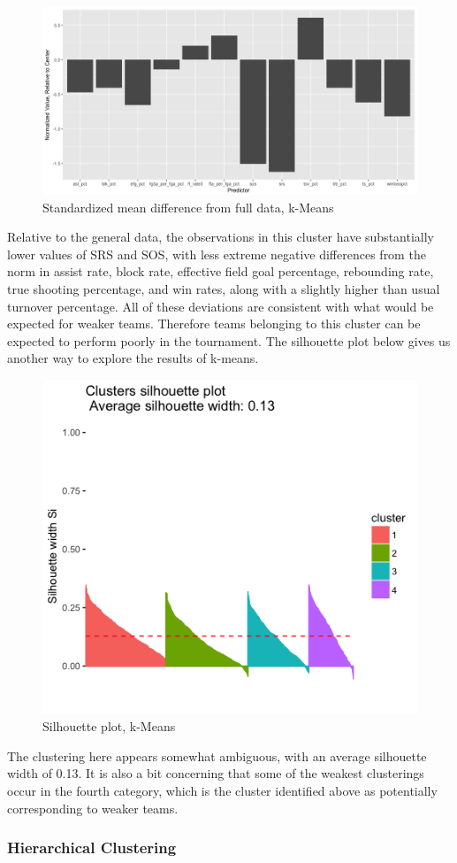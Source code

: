 \documentclass[10pt,a4paper, hidelinks]{article} %
\begin{document}
\begin{figure}[H]
	\centering
	\includegraphics[width=0.7\linewidth]{../fig/weakclusterk}
		\caption{Standardized mean difference from full data, k-Means}
\end{figure}

Relative to the general data, the observations in this cluster have substantially lower values of SRS and SOS, with less extreme negative differences from the norm in assist rate, block rate, effective field goal percentage, rebounding rate, true shooting percentage, and win rates, along with a slightly higher than usual turnover percentage. All of these deviations are consistent with what would be expected for weaker teams. Therefore teams belonging to this cluster can be expected to perform poorly in the tournament.  The silhouette plot below gives us another way to explore the results of k-means.

\begin{figure}[H]
	\centering
	\includegraphics[width=0.5\linewidth]{../fig/kmeansil}
		\caption{Silhouette plot, k-Means}
\end{figure}

The clustering here appears somewhat ambiguous, with an average silhouette width of 0.13.  It is also a bit concerning that some of the weakest clusterings occur in the fourth category, which is the cluster identified above as potentially corresponding to weaker teams.

\subsubsection{Hierarchical Clustering}
\end{document}
